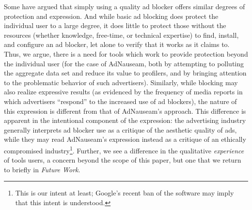 \documentclass[conference]{IEEEtran}
\begin{document}
\indent Some have argued that simply using a quality ad blocker offers similar degrees of protection and expression. And while basic ad blocking does protect the individual user to a large degree, it does little to protect those without the resources (whether knowledge, free-time, or technical expertise) to find, install, and configure an ad blocker, let alone to verify that it works as it claims to. Thus, we argue, there is a need for tools which work to provide protection beyond the individual user (for the case of AdNauseam, both by attempting to polluting the aggregate data set and reduce its value to profilers, and by bringing attention to the problematic behavior of such advertisers). Similarly, while blocking may also realize expressive results (as evidenced by the frequency of media reports in which advertisers “respond” to the increased use of ad blockers), the nature of this expression is different from that of AdNauseam's approach. This difference is apparent in the intentional component of the expression: the advertising industry generally interprets ad blocker use as a critique of the aesthetic quality of ads, while they may read AdNauseam's expression instead as a critique of an ethically compromised industry\footnote{This is our intent at least; Google's recent ban of the software may imply that this intent is understood.}. Further, we see a difference in the qualitative \emph{experience} of tools users, a concern beyond the scope of this paper, but one that we return to briefly in \emph{Future Work}.

\end{document}
